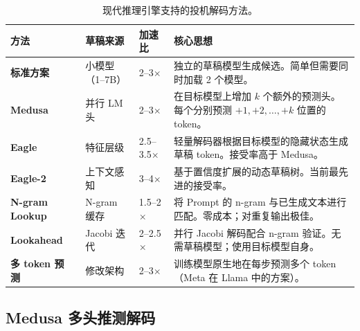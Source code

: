 \begin{table}[H]
\centering\footnotesize
\caption{现代推理引擎支持的投机解码方法。}
\noindent\begin{tabularx}{\linewidth}{@{}l l l Z{1}@{}}
\toprule
\textbf{方法} & \textbf{草稿来源} & \textbf{加速比} & \textbf{核心思想} \\
\midrule
\textbf{标准方案}~\cite{leviathan2023fast} & 小模型（1--7B） & 2--3$\times$ & 独立的草稿模型生成候选。简单但需要同时加载 2 个模型。 \\
\textbf{Medusa}~\cite{cai2024medusa} & 并行 LM 头 & 2--3$\times$ & 在目标模型上增加 $k$ 个额外的预测头。每个分别预测 $+1, +2, \ldots, +k$ 位置的 token。 \\
\textbf{Eagle}~\cite{li2024eagle} & 特征层级 & 2.5--3.5$\times$ & 轻量解码器根据目标模型的隐藏状态生成草稿 token。接受率高于 Medusa。 \\
\textbf{Eagle-2}~\cite{li2024eagle} & 上下文感知 & 3--4$\times$ & 基于置信度扩展的动态草稿树。当前最先进的接受率。 \\
\textbf{N-gram Lookup} & N-gram 缓存 & 1.5--2$\times$ & 将 Prompt 的 n-gram 与已生成文本进行匹配。零成本；对重复输出极佳。 \\
\textbf{Lookahead}~\cite{fu2024lookahead} & Jacobi 迭代 & 2--2.5$\times$ & 并行 Jacobi 解码配合 n-gram 验证。无需草稿模型；使用目标模型自身。 \\
\textbf{多 token 预测}~\cite{gloeckle2024multi} & 修改架构 & 2--3$\times$ & 训练模型原生地在每步预测多个 token（Meta 在 Llama 中的方案）。 \\
\bottomrule
\end{tabularx}
\end{table}

\subsection{Medusa 多头推测解码}
\label{medusa-multi-head-speculative-decoding}

